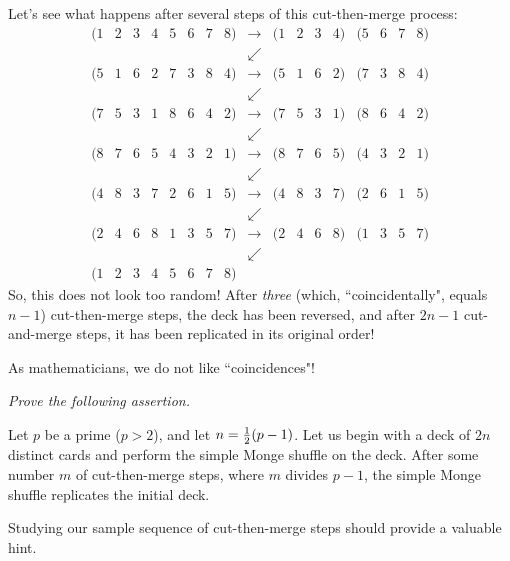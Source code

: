 \begin{enumerate}
\begin{enumerate}
Let's see what happens after several steps of this cut-then-merge process:
\[ \begin{array}{ccccccccccccccccc}
(1 & 2 & 3 & 4 & 5 & 6 & 7 & 8) & \rightarrow & (1 & 2 & 3 & 4) & (5 & 6 & 7 & 8) \\
 & & & & & & & & \swarrow & & & & & & & & \\
(5 & 1 & 6 & 2 & 7 & 3 & 8 & 4) & \rightarrow & (5 & 1 & 6 & 2) & (7 & 3 & 8 & 4) \\
 & & & & & & & & \swarrow & & & & & & & & \\
(7 & 5 & 3 & 1 & 8 & 6 & 4 & 2) &  \rightarrow& (7 & 5 & 3 & 1) & (8 & 6 & 4 & 2) \\
 & & & & & & & & \swarrow & & & & & & & & \\
(8 & 7 & 6 & 5 & 4 & 3 & 2 & 1) &  \rightarrow& (8 & 7 & 6 & 5) & (4 & 3 & 2 & 1) \\
 & & & & & & & & \swarrow & & & & & & & & \\
(4 & 8 & 3 & 7 & 2 & 6 & 1 & 5) &  \rightarrow& (4 & 8 & 3 & 7) & (2 & 6 & 1 & 5) \\
 & & & & & & & & \swarrow & & & & & & & & \\
(2 & 4 & 6 & 8 & 1 & 3 & 5 & 7) &  \rightarrow& (2 & 4 & 6 & 8) & (1 & 3 & 5 & 7) \\
 & & & & & & & & \swarrow & & & & & & & & \\
(1 & 2 & 3 & 4 & 5 & 6 & 7 & 8)
\end{array}
\]
So, this does not look too random!  After {\em three} (which, ``coincidentally", equals $n-1$) cut-then-merge steps, the deck has been reversed, and after $2n-1$ cut-and-merge steps, it has been replicated in its original order!

\smallskip

As mathematicians, we do not like ``coincidences"!

\medskip

{\em Prove the following assertion.}

\begin{prop}
Let $p$ be a prime ($p>2$), and let $n = {1 \over 2} (p-1)$.  Let us begin with a deck of $2n$ distinct cards and perform the simple Monge shuffle on the deck.  After some number $m$ of cut-then-merge steps, where $m$ divides $p-1$, the simple Monge shuffle replicates the initial deck.
\end{prop}

Studying our sample sequence of cut-then-merge steps should provide a valuable hint.

\medskip


\end{enumerate}
\end{enumerate}
